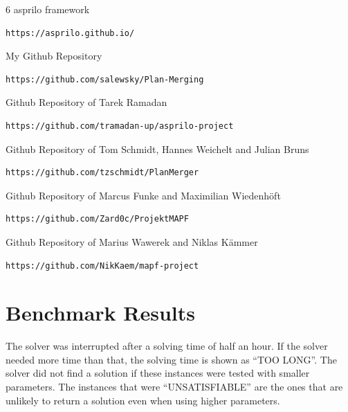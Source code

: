 \documentclass[runningheads]{llncs}
\begin{document}
\begin{thebibliography} {6}
asprilo framework
\begin{verbatim}
https://asprilo.github.io/
\end{verbatim}

My Github Repository
\begin{verbatim}
https://github.com/salewsky/Plan-Merging
\end{verbatim}

Github Repository of Tarek Ramadan
\begin{verbatim}
https://github.com/tramadan-up/asprilo-project
\end{verbatim}

Github Repository of Tom Schmidt, Hannes Weichelt and Julian Bruns
\begin{verbatim}
https://github.com/tzschmidt/PlanMerger
\end{verbatim}

Github Repository of Marcus Funke and Maximilian Wiedenhöft
\begin{verbatim}
https://github.com/Zard0c/ProjektMAPF
\end{verbatim}

Github Repository of Marius Wawerek and Niklas Kämmer
\begin{verbatim}
https://github.com/NikKaem/mapf-project
\end{verbatim}

\end{thebibliography}

\newpage
\appendix
\section{Benchmark Results}
The solver was interrupted after a solving time of half an hour. If the solver needed more time than that,
the solving time is shown as ``TOO LONG''. The solver did not find a solution if these instances were tested with smaller parameters. The instances that were ``UNSATISFIABLE'' are the ones that are unlikely to return a solution even when using
higher parameters. 
\end{document}
